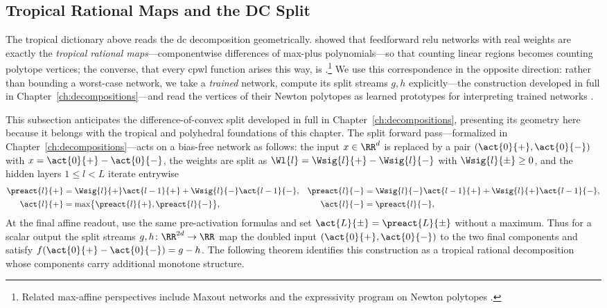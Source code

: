 \subsection{Tropical Rational Maps and the DC Split}\label{sec:tropical_rational_maps}

The tropical dictionary above reads the \ac{dc} decomposition geometrically. \textcite{Zhang2018} showed that feedforward \ac{relu} networks with real weights are exactly the \emph{tropical rational maps}---componentwise differences of max-plus polynomials---so that counting linear regions becomes counting polytope vertices; the converse, that every \ac{cpwl} function arises this way, is \textcite{Arora2018}.\footnote{Related max-affine perspectives include Maxout networks \parencite{Goodfellow2013Maxout} and the expressivity program on Newton polytopes \parencite{Haase2023,Misiakos2022neural,hertrich2025neuralnetworksvirtualextended,huchette2025deeplearningmeetspolyhedral,Brandenburg2024b}.} We use this correspondence in the opposite direction: rather than bounding a worst-case network, we take a \emph{trained} network, compute its split streams $g, h$ explicitly---the construction developed in full in Chapter~\ref{ch:decompositions}---and read the vertices of their Newton polytopes as learned prototypes for interpreting trained networks \parencite{hiddenMono}.

This subsection anticipates the difference-of-convex split developed in full in Chapter~\ref{ch:decompositions}, presenting its geometry here because it belongs with the tropical and polyhedral foundations of this chapter. The split forward pass---formalized in Chapter~\ref{ch:decompositions}---acts on a bias-free network as follows: the input $x \in \RR^d$ is replaced by a pair $(\act{0}{+}, \act{0}{-})$ with $x = \act{0}{+} - \act{0}{-}$, the weights are split as $\Wl{l} = \Wsig{l}{+} - \Wsig{l}{-}$ with $\Wsig{l}{\pm} \ge 0$, and the hidden layers $1\leq l<L$ iterate entrywise
\begin{align}
    \preact{l}{+} &= \Wsig{l}{+} \act{l-1}{+} + \Wsig{l}{-} \act{l-1}{-},
    &
    \preact{l}{-} &= \Wsig{l}{-} \act{l-1}{+} + \Wsig{l}{+} \act{l-1}{-},
    \label{eq:split_preact_recursion}
    \\
    \act{l}{+} &= \max\bigl\{ \preact{l}{+}, \preact{l}{-} \bigr\},
    &
    \act{l}{-} &= \preact{l}{-},
    \label{eq:split_act_recursion}
\end{align}
At the final affine readout, use the same pre-activation formulas and set $\act{L}{\pm}=\preact{L}{\pm}$ without a maximum. Thus for a scalar output the split streams $g, h \colon \RR^{2d} \to \RR$ map the doubled input $(\act{0}{+}, \act{0}{-})$ to the two final components and satisfy $f(\act{0}{+} - \act{0}{-}) = g - h$. The following theorem identifies this construction as a tropical rational decomposition whose components carry additional monotone structure.

